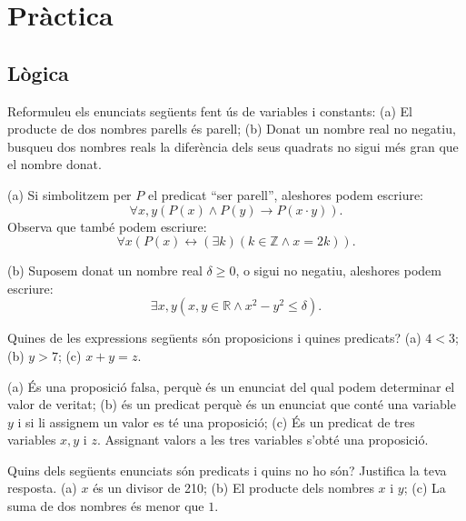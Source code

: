 \chapter{Pràctica}
\label{cap:practica}

\section{Lògica}

\begin{exercici}
Reformuleu els enunciats següents fent ús de variables i constants:
(a) El producte de dos nombres parells és parell; (b) Donat un nombre real
no negatiu, busqueu dos nombres reals la diferència dels seus quadrats no
sigui més gran que el nombre donat.
\end{exercici}

\begin{solucio}
(a) Si simbolitzem per $P$ el predicat \enquote{ser
parell}, aleshores podem escriure:%
\[
\forall x,y\left(  P\left(  x\right)  \wedge P\left(  y\right)
\longrightarrow P\left(  x\cdot y\right)  \right)  \text{.}%
\]
Observa que també podem escriure:%
\[
\forall x\left(  P\left(  x\right)  \longleftrightarrow\left(  \exists
k\right)  \left(  k\in\mathbb{Z}\wedge x=2k\right)  \right)  \text{.}%
\]


(b) Suposem donat un nombre real $\delta\geq0$, o sigui no negatiu, aleshores
podem escriure:%
\[
\exists x,y\left(  x,y\in\mathbb{R}\wedge x^{2}-y^{2}\leq\delta\right)
\text{.}%
\]

\end{solucio}

\begin{exercici}
Quines de les expressions següents són proposicions i quines
predicats? (a) $4<3$; (b) $y>7$; (c) $x+y=z$.
\end{exercici}

\begin{solucio}
(a) És una proposició falsa, perquè és un enunciat del qual podem determinar el valor de veritat; (b)
és un predicat perquè és un enunciat que conté una variable
$y$ i si li assignem un valor es té una proposició; (c) És un
predicat de tres variables $x,y$ i $z$. Assignant valors a les tres variables
s'obté una proposició.
\end{solucio}

\begin{exercici}
Quins dels següents enunciats són predicats i quins no ho són?
Justifica la teva resposta. (a) $x$ és un divisor de 210; (b) El producte
dels nombres $x$ i $y$; (c) La suma de dos nombres és menor que $1$.
\end{exercici}

